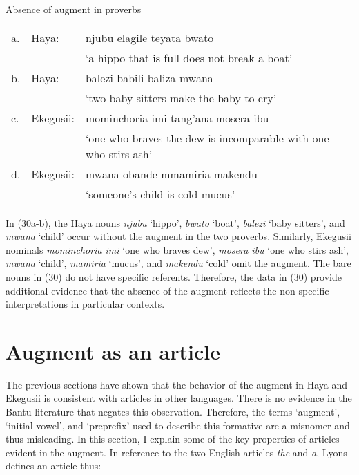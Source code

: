 \documentclass[output=paper]{langscibook}
\begin{document}
\begin{exe}
\ex Absence of augment in proverbs\\
\label{hayagusii30}
\begin{tabular}{p{0.5cm} p{2cm} p{8cm}}
 a.	& Haya:	&	njubu elagile teyata bwato \\
& &‘a hippo that is full does not break a boat’\\
b. &	Haya:	&	balezi babili baliza mwana \\
& &‘two baby sitters make the baby to cry’\\
c. &	Ekegusii: &	mominchoria imi tang’ana mosera ibu \\
& & ‘one who braves the dew is incomparable with one who stirs ash’\\
d. &	Ekegusii: &	mwana obande mmamiria makendu\\
& &‘someone’s child is cold mucus’\\

\end{tabular}
\end{exe}
In (30a-b), the Haya nouns \textit{njubu} ‘hippo’, \textit{bwato} ‘boat’, \textit{balezi} ‘baby sitters’, and \textit{mwana} ‘child’ occur without the augment in the two proverbs. Similarly, Ekegusii nominals \textit{mominchoria imi} ‘one who braves dew’, \textit{mosera ibu} ‘one who stirs ash’, \textit{mwana} ‘child’, \textit{mamiria} ‘mucus’, and \textit{makendu} ‘cold’ omit the augment. The bare nouns in (30) do not have specific referents. Therefore, the data in (30) provide additional evidence that the absence of the augment reflects the non-specific interpretations in particular contexts.

\section{Augment as an article}
The previous sections have shown that the behavior of the augment in Haya and Ekegusii is consistent with articles in other languages. There is no evidence in the Bantu literature that negates this observation. Therefore, the terms ‘augment’, ‘initial vowel’, and ‘preprefix’ used to describe this formative are a misnomer and thus misleading. In this section, I explain some of the key properties of articles evident in the augment. In reference to the two English articles \textit{the} and \textit{a}, Lyons \citet[36]{lyons1999definiteness}  defines an article thus:
\end{document}
